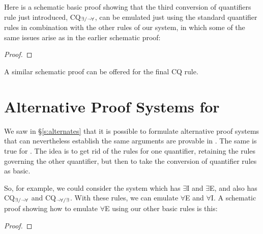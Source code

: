 Here is a schematic basic proof showing that the third conversion of quantifiers rule just introduced, CQ$_{\exists/\neg\forall}$, can be emulated just using the standard quantifier rules in combination with the other rules of our system, in which some of the same issues arise as in the earlier schematic proof: 
\begin{proof}
	\open
		\open
			\open
			\close
		\close
	\close
\end{proof}
A similar schematic proof can be offered for the final CQ rule.

\section{Alternative Proof Systems for \FOL}

We saw in §\ref{s:alternates} that it is possible to formulate alternative proof systems that can nevertheless establish the same arguments are provable in \TFL. The same is true for \FOL. The idea is to get rid of the rules for one quantifier, retaining the rules governing the other quantifier, but then to take the conversion of quantifier rules as basic. 

So, for example, we could consider the system which has $\exists$I and $\exists$E, and also has CQ$_{\exists/\neg\forall}$ and CQ$_{\neg\forall/\exists}$. With these rules, we can emulate $\forall$E and $\forall$I. A schematic proof showing how to emulate $\forall$E using our other basic rules is this:
\begin{proof}
	\open
	\close
\end{proof}

